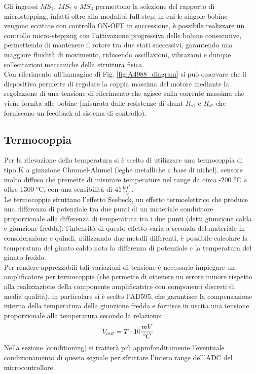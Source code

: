 \documentclass[12pt]{article}
\begin{document}
        \noindent
        Gli ingressi $MS_1$, $MS_2$ e $MS_3$ permettono la selezione del rapporto di microstepping, infatti oltre alla modalità full-step, in cui le singole bobine vengono eccitate con controllo ON-OFF in successione, è possibile realizzare un controllo micro-stepping con l'attivazione progressiva delle bobine consecutive, permettendo di mantenere il rotore tra due stati successivi, garantendo una maggiore fluidità di movimento, riducendo oscillazioni, vibrazioni e dunque sollecitazioni meccaniche della struttura fisica.\\
        Con riferimento all'immagine di Fig. \ref{fig:A4988_diagram} si può osservare che il dispositivo permette di regolare la coppia massima del motore mediante la regolazione di una tensione di riferimento che agisce sulla corrente massima che viene fornita alle bobine (mi\-su\-ra\-ta dalle resistenze di shunt $R_{s1}$ e $R_{s2}$ che forniscono un feedback al sistema di controllo).

        \vspace{0.1cm}


    \subsection{Termocoppia}\label{thermocouple}
    Per la rilevazione della temperatura si è scelto di utilizzare una termocoppia di tipo K a giunzione Chromel-Alumel (leghe metalliche a base di nichel), sensore molto diffuso che premette di misurare temperature nel range da circa -200 °C a oltre 1300 °C, con una sensibilità di $41 \frac{\mu V}{\degree C}$.\\
    Le termocoppie sfruttano l'effetto Seebeck, un effetto termoelettrico che produce una differenza di potenziale tra due punti di un materiale conduttore proporzionale alla differenza di temperatura tra i due punti (detti giunzione calda e giunzione fredda); l'intensità di questo effetto varia a seconda del materiale in considerazione e quindi, utilizzando due metalli differenti, è possibile calcolare la temperatura del giunto caldo nota la differenza di potenziale e la temperatura del giunto freddo.\\
    Per rendere apprezzabili tali variazioni di tensione è necessario impiegare un amplificatore per termocoppie (che permette di ottenere un errore minore rispetto alla realizzazione della componente amplificatrice con componenti discreti di media qualità), in particolare si è scelto l'AD595, che garantisce la compensazione interna della temperatura della giunzione fredda e fornisce in uscita una tensione proporzionale alla temperatura secondo la relazione:
    \begin{equation}\label{thermocouple_relation_AD595}
        V_{out} = T \cdot 10 \frac{mV}{\degree C}
    \end{equation}
    Nella sezione \ref{conditioning} si tratterà più approfonditamente l'eventuale condizionamento di questo segnale per sfruttare l'intero range dell'ADC del microcontrollore.
    
\end{document}
